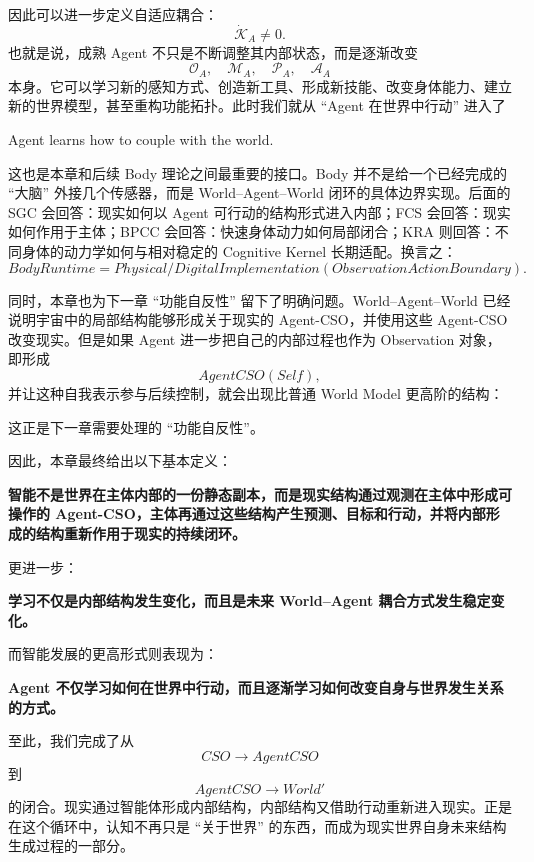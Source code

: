 因此可以进一步定义自适应耦合：
\[
\dot{\mathcal K}_A
\neq
0.
\]
也就是说，成熟 Agent 不只是不断调整其内部状态，而是逐渐改变
\[
\mathcal O_A,\quad
\mathcal M_A,\quad
\mathcal P_A,\quad
\mathcal A_A
\]
本身。它可以学习新的感知方式、创造新工具、形成新技能、改变身体能力、建立新的世界模型，甚至重构功能拓扑。此时我们就从 ``Agent 在世界中行动'' 进入了
\begin{statementbox}
Agent learns how to couple with the world.
\end{statementbox}

这也是本章和后续 Body 理论之间最重要的接口。Body 并不是给一个已经完成的 ``大脑'' 外接几个传感器，而是 World--Agent--World 闭环的具体边界实现。后面的 SGC 会回答：现实如何以 Agent 可行动的结构形式进入内部；FCS 会回答：现实如何作用于主体；BPCC 会回答：快速身体动力如何局部闭合；KRA 则回答：不同身体的动力学如何与相对稳定的 Cognitive Kernel 长期适配。换言之：
\[
\boxed{
BodyRuntime
=
Physical/DigitalImplementation
\left(
ObservationActionBoundary
\right).
}
\]

同时，本章也为下一章 ``功能自反性'' 留下了明确问题。World--Agent--World 已经说明宇宙中的局部结构能够形成关于现实的 Agent-CSO，并使用这些 Agent-CSO 改变现实。但是如果 Agent 进一步把自己的内部过程也作为 Observation 对象，即形成
\[
AgentCSO(Self),
\]
并让这种自我表示参与后续控制，就会出现比普通 World Model 更高阶的结构：
\begin{statementbox}
\centering
{}
\end{statementbox}
这正是下一章需要处理的 ``功能自反性''。

因此，本章最终给出以下基本定义：

\begin{definition*}
\bfseries
智能不是世界在主体内部的一份静态副本，而是现实结构通过观测在主体中形成可操作的 Agent-CSO，主体再通过这些结构产生预测、目标和行动，并将内部形成的结构重新作用于现实的持续闭环。
\end{definition*}

更进一步：

\begin{statementbox}
\bfseries
学习不仅是内部结构发生变化，而且是未来 World--Agent 耦合方式发生稳定变化。
\end{statementbox}

而智能发展的更高形式则表现为：

\begin{statementbox}
\bfseries
Agent 不仅学习如何在世界中行动，而且逐渐学习如何改变自身与世界发生关系的方式。
\end{statementbox}

至此，我们完成了从
\[
CSO
\rightarrow
AgentCSO
\]
到
\[
AgentCSO
\rightarrow
World'
\]
的闭合。现实通过智能体形成内部结构，内部结构又借助行动重新进入现实。正是在这个循环中，认知不再只是 ``关于世界'' 的东西，而成为现实世界自身未来结构生成过程的一部分。

